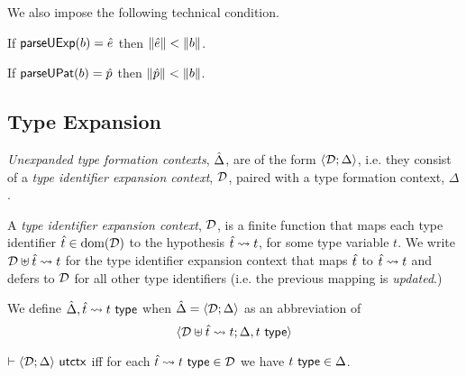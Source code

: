 We also impose the following technical condition.

\begin{condition}\label{condition:body-parsing} If $\mathsf{parseUExp}(b)={\hat e}$ then $\Vert {\hat e} \Vert < \Vert b \Vert$.\end{condition}

\begin{grayparbox}\begin{condition}\label{condition:pattern-parsing} If $\mathsf{parseUPat}(b)=\hat{p}$ then $\Vert \hat{p} \Vert < \Vert b \Vert$.\end{condition}\end{grayparbox}

\subsection{Type Expansion}
\emph{Unexpanded type formation contexts}, $\hat{\Delta}$, are of the form $\langle \mathcal{D}; \Delta \rangle$, i.e. they consist of a \emph{type identifier expansion context}, $\mathcal{D}$, paired with a type formation context, $\Delta$. 

A \emph{type identifier expansion context}, $\mathcal{D}$, is a finite function that maps each type identifier ${\hat{t}} \in \text{dom}(\mathcal{D})$ to the hypothesis ${\hat{t}} \leadsto t$, for some type variable $t$. We write $\mathcal{D} \uplus {\hat{t}} \leadsto t$ for the type identifier expansion context that maps ${\hat{t}}$ to ${\hat{t}} \leadsto t$ and defers to $\mathcal{D}$ for all other type identifiers (i.e. the previous mapping is \emph{updated}.) 

We define $\hat{\Delta}, {\hat{t}} \leadsto t~\mathsf{type}$ when $\hat{\Delta}=\langle \mathcal{D}; \Delta \rangle$ as an abbreviation of  \[\langle \mathcal{D} \uplus {\hat{t}} \leadsto t; \Delta, t~\mathsf{type} \rangle\]%

\begin{definition} $\vdash \langle \mathcal{D}; \Delta \rangle~\mathsf{utctx}$ iff for each ${\hat{t}} \leadsto t~\mathsf{type} \in \mathcal{D}$ we have $t~\mathsf{type} \in \Delta$. \end{definition}

